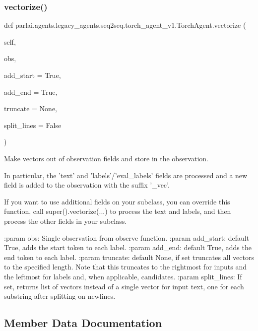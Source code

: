 \subsubsection{\texorpdfstring{vectorize()}{vectorize()}}
{\footnotesize\ttfamily def parlai.\+agents.\+legacy\+\_\+agents.\+seq2seq.\+torch\+\_\+agent\+\_\+v1.\+Torch\+Agent.\+vectorize (\begin{DoxyParamCaption}\item[{}]{self,  }\item[{}]{obs,  }\item[{}]{add\+\_\+start = {\ttfamily True},  }\item[{}]{add\+\_\+end = {\ttfamily True},  }\item[{}]{truncate = {\ttfamily None},  }\item[{}]{split\+\_\+lines = {\ttfamily False} }\end{DoxyParamCaption})}

\begin{DoxyVerb}Make vectors out of observation fields and store in the observation.

In particular, the 'text' and 'labels'/'eval_labels' fields are
processed and a new field is added to the observation with the suffix
'_vec'.

If you want to use additional fields on your subclass, you can override
this function, call super().vectorize(...) to process the text and
labels, and then process the other fields in your subclass.

:param obs:         Single observation from observe function.
:param add_start:   default True, adds the start token to each label.
:param add_end:     default True, adds the end token to each label.
:param truncate:    default None, if set truncates all vectors to the
            specified length. Note that this truncates to the
            rightmost for inputs and the leftmost for labels
            and, when applicable, candidates.
:param split_lines: If set, returns list of vectors instead of a single
            vector for input text, one for each substring after
            splitting on newlines.
\end{DoxyVerb}
 

\subsection{Member Data Documentation}
\mbox{\label{classparlai_1_1agents_1_1legacy__agents_1_1seq2seq_1_1torch__agent__v1_1_1TorchAgent_a81f970d715f2525ad342330a28703c5c}} 
